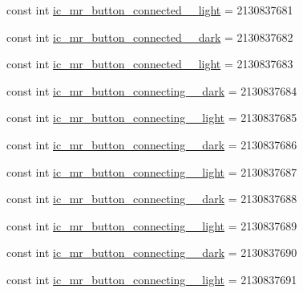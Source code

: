 \begin{DoxyCompactItemize}
const int \mbox{\hyperlink{class_f_w_p_s___app_1_1_droid_1_1_resource_1_1_drawable_aae8033b5ba607f6c3f8ae4e563edfb7c}{ic\+\_\+mr\+\_\+button\+\_\+connected\+\_\+\_\+light}} = 2130837681
\item 
const int \mbox{\hyperlink{class_f_w_p_s___app_1_1_droid_1_1_resource_1_1_drawable_a3b0131420d2fa2b39e46bb5e4949d2e1}{ic\+\_\+mr\+\_\+button\+\_\+connected\+\_\+\_\+dark}} = 2130837682
\item 
const int \mbox{\hyperlink{class_f_w_p_s___app_1_1_droid_1_1_resource_1_1_drawable_a3f240c9f0736c5385c84f06e1e411e8d}{ic\+\_\+mr\+\_\+button\+\_\+connected\+\_\+\_\+light}} = 2130837683
\item 
const int \mbox{\hyperlink{class_f_w_p_s___app_1_1_droid_1_1_resource_1_1_drawable_a9e0c253a413e4eb48906fb499f1f8720}{ic\+\_\+mr\+\_\+button\+\_\+connecting\+\_\+\_\+dark}} = 2130837684
\item 
const int \mbox{\hyperlink{class_f_w_p_s___app_1_1_droid_1_1_resource_1_1_drawable_a8559bc2e302c0a5256bbf2920af77645}{ic\+\_\+mr\+\_\+button\+\_\+connecting\+\_\+\_\+light}} = 2130837685
\item 
const int \mbox{\hyperlink{class_f_w_p_s___app_1_1_droid_1_1_resource_1_1_drawable_a7d3ffe94bf22f360e88e6b9013bb88c5}{ic\+\_\+mr\+\_\+button\+\_\+connecting\+\_\+\_\+dark}} = 2130837686
\item 
const int \mbox{\hyperlink{class_f_w_p_s___app_1_1_droid_1_1_resource_1_1_drawable_a7973e3ebb18770b123d0aa582681008d}{ic\+\_\+mr\+\_\+button\+\_\+connecting\+\_\+\_\+light}} = 2130837687
\item 
const int \mbox{\hyperlink{class_f_w_p_s___app_1_1_droid_1_1_resource_1_1_drawable_a15e47ce2727eb5a373f18aa113eaebfd}{ic\+\_\+mr\+\_\+button\+\_\+connecting\+\_\+\_\+dark}} = 2130837688
\item 
const int \mbox{\hyperlink{class_f_w_p_s___app_1_1_droid_1_1_resource_1_1_drawable_a5534756b835a321176118aed13dbbb14}{ic\+\_\+mr\+\_\+button\+\_\+connecting\+\_\+\_\+light}} = 2130837689
\item 
const int \mbox{\hyperlink{class_f_w_p_s___app_1_1_droid_1_1_resource_1_1_drawable_aac1e3cb2caf72ade708f5f0495663327}{ic\+\_\+mr\+\_\+button\+\_\+connecting\+\_\+\_\+dark}} = 2130837690
\item 
const int \mbox{\hyperlink{class_f_w_p_s___app_1_1_droid_1_1_resource_1_1_drawable_a2c98ca8dd56da79324f4450e6611f14a}{ic\+\_\+mr\+\_\+button\+\_\+connecting\+\_\+\_\+light}} = 2130837691
\item 

\end{DoxyCompactItemize}
